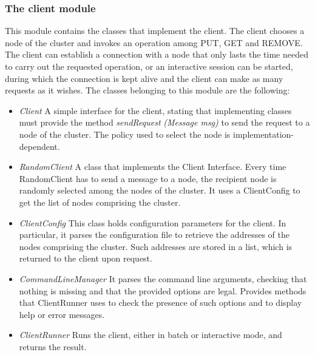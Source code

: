 \documentclass{article}
\begin{document}
\subsubsection{The client module} 
This module contains the classes that implement the client. The client chooses a node of the cluster and invokes an operation among PUT, GET and REMOVE. The client can establish a connection with a node that only lasts the time needed to carry out the requested operation, or an interactive session can be started, during which the connection is kept alive and the client can make as many requests as it wishes. The classes belonging to this module are the following:
\begin{itemize}
\item \textit{Client} A simple interface for the client, stating that implementing classes must provide the method \textit{sendRequest} \textit{(Message msg)} to send the request to a node of the cluster. The policy used to select the node is implementation-dependent.
\item \textit{RandomClient} A class that implements the Client Interface. Every time RandomClient has to send a message to a node, the recipient node is randomly selected among the nodes of the cluster. It uses a ClientConfig to get the list of nodes comprising the cluster.
\item \textit{ClientConfig} This class holds configuration parameters for the client. In particular, it parses the configuration file to retrieve the addresses of the nodes comprising the cluster. Such addresses are stored in a list, which is returned to the client upon request.
\item \textit{CommandLineManager} It parses the command line arguments, checking that nothing is missing and that the provided options are legal. Provides methods that ClientRunner uses to check the presence of such options and to display help or error messages.
\item \textit{ClientRunner} Runs the client, either in batch or interactive mode, and returns the result. 
\end{itemize}
\end{document}
